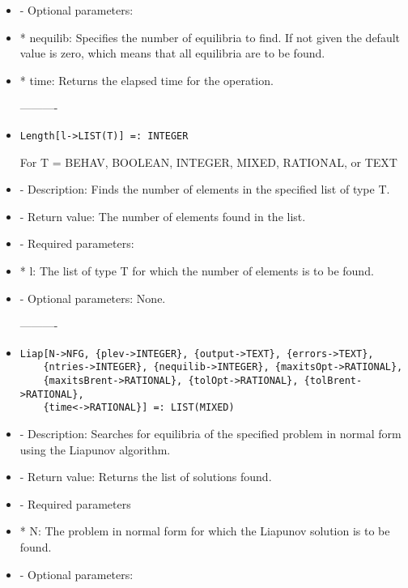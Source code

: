 \begin{itemize}
\item
- Optional parameters: 

\bd
\item
*  nequilib:  Specifies the number of equilibria to find.  If not
given the default value is zero, which means that all 
equilibria are to be found.
\item
*  time:  Returns the elapsed time for the operation.
\ed
\ed

----------

\item
\begin{verbatim}
Length[l->LIST(T)] =: INTEGER
\end{verbatim}
	For T = BEHAV, BOOLEAN, INTEGER, MIXED, RATIONAL, or TEXT

\bd
\item
- Description:  Finds the number of elements in the specified list of 
type T.
\item
- Return value:  The number of elements found in the list.
\item
- Required parameters:

\bd
\item
*  l:  The list of type T for which the number of elements is to be found.
\ed

\item
- Optional parameters:  None.
\ed

----------

\item
\begin{verbatim}
Liap[N->NFG, {plev->INTEGER}, {output->TEXT}, {errors->TEXT}, 
	{ntries->INTEGER}, {nequilib->INTEGER}, {maxitsOpt->RATIONAL},
	{maxitsBrent->RATIONAL}, {tolOpt->RATIONAL}, {tolBrent->RATIONAL},
	{time<->RATIONAL}] =: LIST(MIXED)
\end{verbatim}

\bd
\item
- Description:  Searches for equilibria of the specified problem in 
normal form using the Liapunov algorithm.
\item
- Return value:  Returns the list of solutions found.
\item
- Required parameters

\bd
\item
*  N:  The problem in normal form for which the Liapunov solution is 
to be found.
\ed

\item
- Optional parameters:


\end{itemize}

